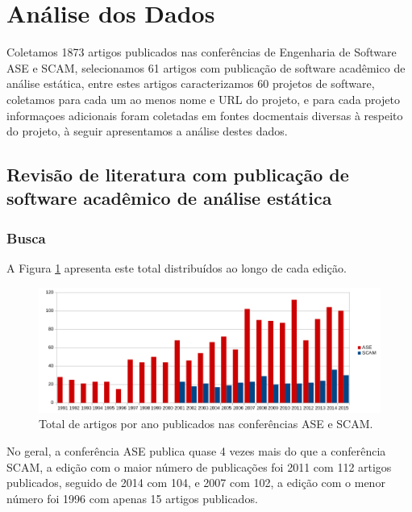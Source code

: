 


\section{Análise dos Dados} \label{estudo1:analise}

Coletamos 1873 artigos publicados nas conferências de Engenharia de Software
ASE e SCAM, selecionamos 61 artigos com publicação de software acadêmico de
análise estática, entre estes artigos caracterizamos 60 projetos de software,
coletamos para cada um ao menos nome e URL do projeto, e para cada projeto
informaçoes adicionais foram coletadas em fontes docmentais diversas à respeito
do projeto, à seguir apresentamos a análise destes dados.

\subsection{Revisão de literatura com publicação de software acadêmico de análise estática}

\subsubsection{Busca}

A Figura \ref{artigos-por-ano} apresenta este total distribuídos ao longo de
cada edição.

\begin{figure}[h]
  \center
  \includegraphics[scale=0.65]{imagens/artigos-por-ano.png}
  \caption{Total de artigos por ano publicados nas conferências ASE e SCAM.}
  \label{artigos-por-ano}
\end{figure}

No geral, a conferência ASE publica quase 4 vezes mais do que a conferência
SCAM, a edição com o maior número de publicações foi 2011 com 112 artigos
publicados, seguido de 2014 com 104, e 2007 com 102, a edição com o menor
número foi 1996 com apenas 15 artigos publicados.

